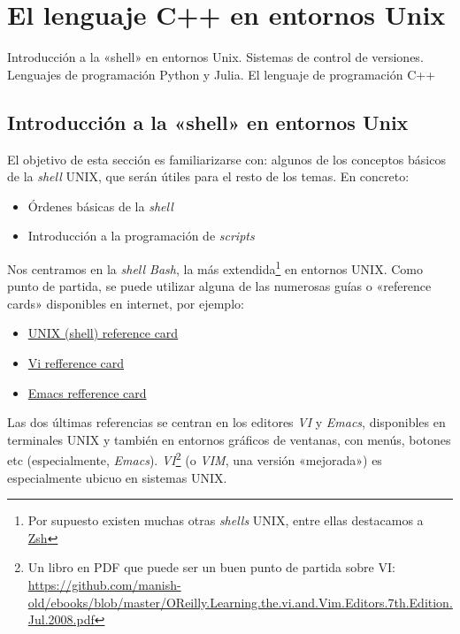 
\section{El lenguaje C++ en entornos Unix}

\begin{contenidos}
  Introducción a la «shell» en entornos Unix. Sistemas
  de control de versiones. Lenguajes de programación
  Python y Julia. El lenguaje de programación C++ 
\end{contenidos}


\subsection{Introducción a la «shell» en entornos Unix}
\label{sec:intr-la-shell}

El objetivo de esta sección es familiarizarse con: algunos de los
conceptos básicos de la \textit{shell} UNIX, que serán útiles para el
resto de los temas. En concreto:
\begin{itemize}
\item Órdenes básicas de la \textit{shell}
\item Introducción a la programación de \textit{scripts}
\end{itemize}

Nos centramos en la \textit{shell Bash}, la más extendida\footnote{Por
  supuesto existen muchas otras \textit{shells} UNIX, entre ellas
  destacamos a \href{https://www.zsh.org/}{Zsh}} en entornos
UNIX. Como punto de partida, se puede utilizar alguna de las numerosas
guías o «reference cards» disponibles en internet, por ejemplo:
\begin{itemize}
\item \href{https://www.cs.jhu.edu/~joanne/unixRC.pdf}{UNIX (shell) reference card}
\item \href{http://web.mit.edu/merolish/Public/vi-ref.pdf}{Vi refference card}
\item \href{https://www.gnu.org/software/emacs/refcards/pdf/refcard.pdf}{Emacs refference card}
\end{itemize}

Las dos últimas referencias se centran en los editores \textit{VI} y
\textit{Emacs}, disponibles en terminales UNIX y también en entornos
gráficos de ventanas, con menús, botones etc (especialmente,
\textit{Emacs}). \textit{VI}\footnote{Un libro en PDF que puede ser un
  buen punto de partida sobre VI:
  \url{https://github.com/manish-old/ebooks/blob/master/OReilly.Learning.the.vi.and.Vim.Editors.7th.Edition.Jul.2008.pdf}}
(o \textit{VIM}, una versión «mejorada») es especialmente ubicuo en
sistemas UNIX.


